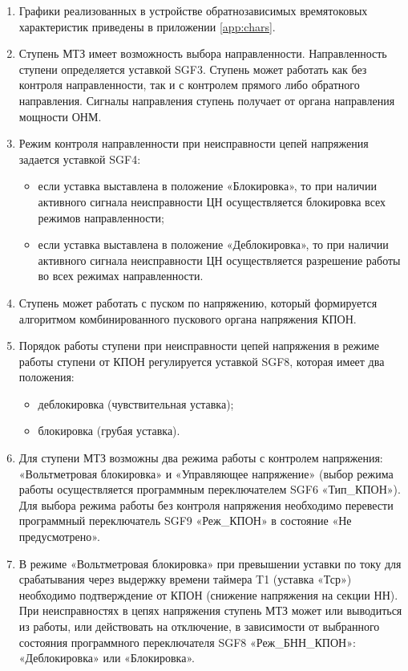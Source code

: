 \begin{enumerate}
\begin{enumerate}
\item
Графики реализованных в устройстве обратнозависимых времятоковых характеристик приведены в приложении \ref{app:chars}.

\item
Ступень МТЗ имеет возможность выбора направленности. Направленность ступени определяется уставкой SGF3.  Ступень может работать как без контроля направленности, так и с контролем прямого либо обратного направления. Сигналы направления ступень получает от органа направления мощности ОНМ.

\item
Режим контроля направленности при неисправности цепей напряжения задается уставкой SGF4:
\begin{itemize}
    \item если уставка выставлена в положение «Блокировка», то при наличии активного сигнала неисправности ЦН осуществляется блокировка всех режимов направленности; 
    \item если уставка выставлена в положение «Деблокировка», то при наличии активного сигнала неисправности ЦН осуществляется разрешение работы во всех режимах направленности. 
\end{itemize}

\item
Ступень может работать с  пуском по напряжению, который формируется алгоритмом комбинированного пускового органа напряжения КПОН. 

\item
Порядок работы ступени при неисправности цепей напряжения в режиме работы ступени от КПОН регулируется уставкой SGF8, которая имеет два положения:
\begin{itemize}
    \item деблокировка (чувствительная уставка); 
    \item блокировка (грубая уставка). 
\end{itemize}

\item
Для ступени МТЗ возможны два режима работы с контролем напряжения: «Вольтметровая блокировка» и «Управляющее напряжение» (выбор режима работы осуществляется программным переключателем SGF6 «Тип\_КПОН»). Для выбора режима работы без контроля напряжения необходимо перевести программный переключатель SGF9 «Реж\_КПОН» в состояние «Не предусмотрено».

\item
В режиме «Вольтметровая блокировка» при превышении уставки по току для срабатывания через выдержку времени таймера T1 (уставка «Тср») необходимо подтверждение от КПОН (снижение напряжения на секции НН). При неисправностях в цепях напряжения ступень МТЗ может или выводиться из работы, или действовать на отключение, в зависимости от выбранного состояния программного переключателя SGF8 «Реж\_БНН\_КПОН»: «Деблокировка» или «Блокировка».


\end{enumerate}
\end{enumerate}
